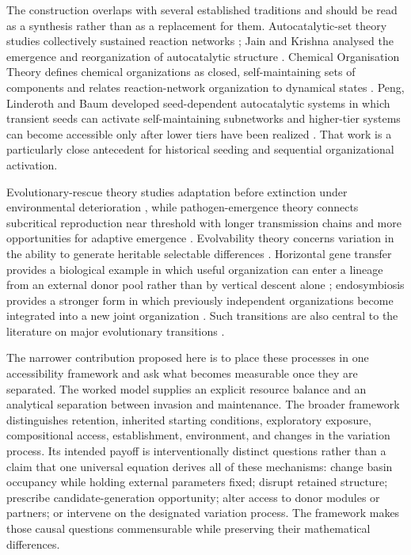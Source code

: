\documentclass[11pt,a4paper]{article}
\begin{document}
The construction overlaps with several established traditions and should be read as a synthesis rather than as a replacement for them. Autocatalytic-set theory studies collectively sustained reaction networks \citep{Hordijk2010,Hordijk2012}; Jain and Krishna analysed the emergence and reorganization of autocatalytic structure \citep{Jain1998,Jain2001}. Chemical Organisation Theory defines chemical organizations as closed, self-maintaining sets of components and relates reaction-network organization to dynamical states \citep{Dittrich2007}. Peng, Linderoth and Baum developed seed-dependent autocatalytic systems in which transient seeds can activate self-maintaining subnetworks and higher-tier systems can become accessible only after lower tiers have been realized \citep{Peng2022}. That work is a particularly close antecedent for historical seeding and sequential organizational activation.

Evolutionary-rescue theory studies adaptation before extinction under environmental deterioration \citep{Bell2017,Ferriere2013}, while pathogen-emergence theory connects subcritical reproduction near threshold with longer transmission chains and more opportunities for adaptive emergence \citep{Antia2003,Woolhouse2005}. Evolvability theory concerns variation in the ability to generate heritable selectable differences \citep{WagnerAltenberg1996,Gerhart2007}. Horizontal gene transfer provides a biological example in which useful organization can enter a lineage from an external donor pool rather than by vertical descent alone \citep{Soucy2015}; endosymbiosis provides a stronger form in which previously independent organizations become integrated into a new joint organization \citep{Archibald2015}. Such transitions are also central to the literature on major evolutionary transitions \citep{SzathmarySmith1995}.

The narrower contribution proposed here is to place these processes in one accessibility framework and ask what becomes measurable once they are separated. The worked model supplies an explicit resource balance and an analytical separation between invasion and maintenance. The broader framework distinguishes retention, inherited starting conditions, exploratory exposure, compositional access, establishment, environment, and changes in the variation process. Its intended payoff is interventionally distinct questions rather than a claim that one universal equation derives all of these mechanisms: change basin occupancy while holding external parameters fixed; disrupt retained structure; prescribe candidate-generation opportunity; alter access to donor modules or partners; or intervene on the designated variation process. The framework makes those causal questions commensurable while preserving their mathematical differences.
\end{document}
